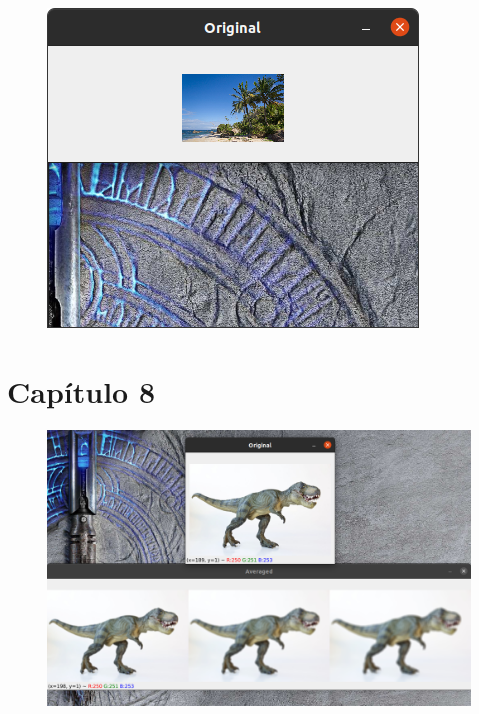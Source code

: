 \documentclass[12pt,letterpaper]{article}
\begin{document}
\begin{multicols}{2}
\begin{figure}[H]
\centering
\includegraphics[width = \columnwidth]{Resultado2_ch7_4.png}
\end{figure} 



\section{Capítulo 8}

\begin{figure}[H]
\centering
\includegraphics[width = \columnwidth]{Resultado1_ch8.png}
\end{figure} 


\end{multicols}
\end{document}
